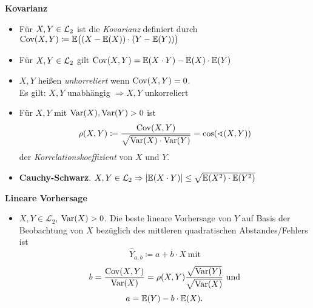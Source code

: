 \textbf{Kovarianz}
\begin{itemize}
\item Für $X,Y\in\mathcal{L}_2$ ist die \textit{Kovarianz} definiert durch
 \mbox{$\operatorname{Cov}(X,Y) \coloneqq \mathbb{E}\big( (X-\mathbb{E}(X)) \cdot (Y-\mathbb{E}(Y)) \big)$}

\item Für $X,Y\in\mathcal{L}_2$ gilt $\operatorname{Cov}(X,Y) = \mathbb{E}(X \cdot Y) - \mathbb{E}(X) \cdot \mathbb{E}(Y)$

\item $X,Y$ heißen \textit{unkorreliert} wenn $\operatorname{Cov}(X,Y) = 0$.\\
  Es gilt: $X,Y$ unabhängig $\Rightarrow X,Y$ unkorreliert

\item Für $X,Y$ mit $\operatorname{Var}(X),\operatorname{Var}(Y)>0$ ist
  \[
    \rho(X,Y) \coloneqq \frac{\operatorname{Cov}(X,Y)}{\sqrt{\operatorname{Var}(X)\cdot\operatorname{Var}(Y)}} =
    \cos(\sphericalangle (X,Y))
  \]
  der \textit{Korrelationskoeffizient} von $X$ und $Y$.

\item \textbf{Cauchy-Schwarz}. $X,Y\in\mathcal{L}_2
  \Rightarrow |\mathbb{E}(X \cdot Y)| \leq \sqrt{\mathbb{E}(X^2) \cdot \mathbb{E}(Y^2)}$
\end{itemize}
\hspace{3em}

\textbf{Lineare Vorhersage}
\begin{itemize}
	\item $X,Y\in\mathcal{L}_2$, $\operatorname{Var}(X)>0$. Die beste lineare Vorhersage von $Y$ auf Basis der Beobachtung von $X$ bezüglich des mittleren quadratischen Abstandes/Fehlers ist
	\[
	  \hat Y_{a,b}\coloneqq a+b\cdot X\ \text{mit}
	\]
	\[
	  b=\frac{\Cov(X,Y)}{\Var(X)}=\rho(X,Y)\frac{\sqrt{\Var(Y)}}{\sqrt{\Var(X)}}\ \text{und}
	\]
	\[
	  a=\mathbb{E}(Y)-b\cdot\mathbb{E}(X).
	\]
\end{itemize}
